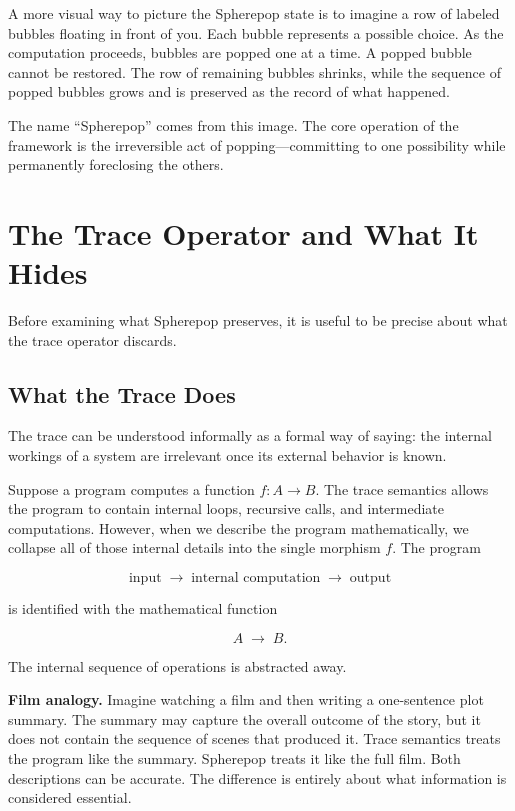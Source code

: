 \documentclass[12pt]{article}
\begin{document}
A more visual way to picture the Spherepop state is to imagine a row of labeled bubbles floating in front of you. Each bubble represents a possible choice. As the computation proceeds, bubbles are popped one at a time. A popped bubble cannot be restored. The row of remaining bubbles shrinks, while the sequence of popped bubbles grows and is preserved as the record of what happened.

The name ``Spherepop'' comes from this image. The core operation of the framework is the irreversible act of popping---committing to one possibility while permanently foreclosing the others.

\section{The Trace Operator and What It Hides}
\label{sec:traces}

Before examining what Spherepop preserves, it is useful to be precise about what the trace operator discards.

\subsection{What the Trace Does}

The trace can be understood informally as a formal way of saying: the internal workings of a system are irrelevant once its external behavior is known.

Suppose a program computes a function $f : A \to B$. The trace semantics allows the program to contain internal loops, recursive calls, and intermediate computations. However, when we describe the program mathematically, we collapse all of those internal details into the single morphism $f$. The program

\[
\text{input} \;\longrightarrow\; \text{internal computation} \;\longrightarrow\; \text{output}
\]

is identified with the mathematical function

\[
A \;\longrightarrow\; B.
\]

The internal sequence of operations is abstracted away.

\medskip

\noindent \textbf{Film analogy.} Imagine watching a film and then writing a one-sentence plot summary. The summary may capture the overall outcome of the story, but it does not contain the sequence of scenes that produced it. Trace semantics treats the program like the summary. Spherepop treats it like the full film. Both descriptions can be accurate. The difference is entirely about what information is considered essential.
\end{document}

